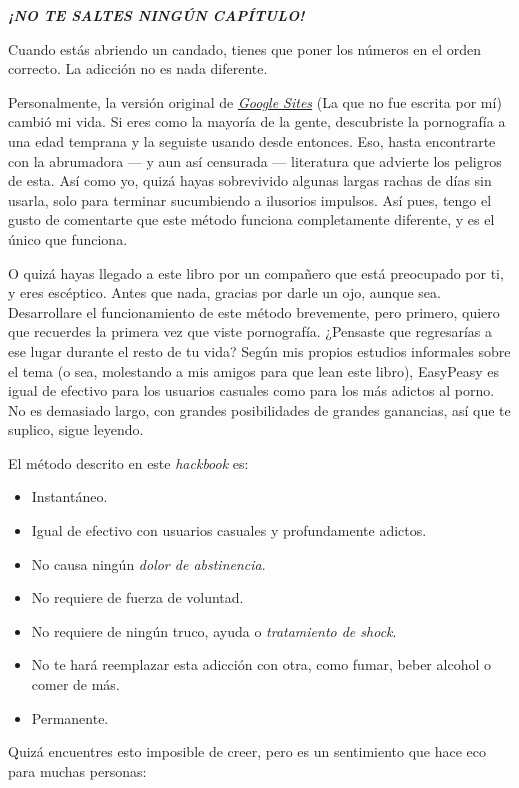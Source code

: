 \documentclass[
]{book}
\providecommand{\tightlist}{%
  \setlength{\itemsep}{0pt}\setlength{\parskip}{0pt}}
\begin{document}
{\emph{\textbf{¡NO TE SALTES NINGÚN CAPÍTULO!}}}

Cuando estás abriendo un candado, tienes que poner los números en el orden correcto. La adicción no es nada diferente.

Personalmente, la versión original de \href{https://sites.google.com/site/sites/system/errors/WebspaceNotFound?path=\%2Fhackbookeasypeasy}{\emph{Google Sites}} (La que no fue escrita por mí) cambió mi vida. Si eres como la mayoría de la gente, descubriste la pornografía a una edad temprana y la seguiste usando desde entonces. Eso, hasta encontrarte con la abrumadora --- y aun así censurada --- literatura que advierte los peligros de esta. Así como yo, quizá hayas sobrevivido algunas largas rachas de días sin usarla, solo para terminar sucumbiendo a ilusorios impulsos. Así pues, tengo el gusto de comentarte que este método funciona completamente diferente, y es el único que funciona.

O quizá hayas llegado a este libro por un compañero que está preocupado por ti, y eres escéptico. Antes que nada, gracias por darle un ojo, aunque sea. Desarrollare el funcionamiento de este método brevemente, pero primero, quiero que recuerdes la primera vez que viste pornografía. ¿Pensaste que regresarías a ese lugar durante el resto de tu vida? Según mis propios estudios informales sobre el tema (o sea, molestando a mis amigos para que lean este libro), EasyPeasy es igual de efectivo para los usuarios casuales como para los más adictos al porno. No es demasiado largo, con grandes posibilidades de grandes ganancias, así que te suplico, sigue leyendo.

El método descrito en este \emph{hackbook} es:

\begin{itemize}
\tightlist
\item
  Instantáneo.
\item
  Igual de efectivo con usuarios casuales y profundamente adictos.
\item
  No causa ningún \emph{dolor de abstinencia}.
\item
  No requiere de fuerza de voluntad.
\item
  No requiere de ningún truco, ayuda o \emph{tratamiento de shock}.
\item
  No te hará reemplazar esta adicción con otra, como fumar, beber alcohol o comer de más.
\item
  Permanente.
\end{itemize}

Quizá encuentres esto imposible de creer, pero es un sentimiento que hace eco para muchas personas:
\end{document}
